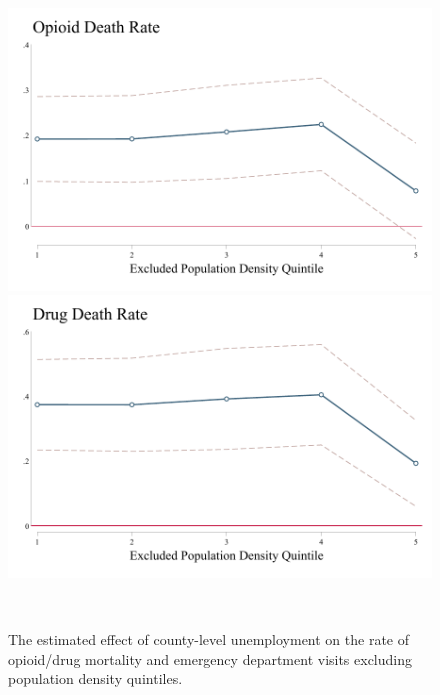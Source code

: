 \documentclass[12pt]{article}
\begin{document}
\FloatBarrier
			\newpage
		\FloatBarrier
		\begin{figure}[h]
			\caption[Excluding population density quintiles]{The estimated effect of county-level unemployment on the rate of opioid/drug mortality and emergency department visits excluding population density quintiles.}
			\begin{minipage}[c]{0.48\linewidth}
				\centering
				\includegraphics[width=\linewidth]{../results/appendix/figures/opioid_by_pop_den_quintile.pdf}
							  	\includegraphics[width=\linewidth]{../results/appendix/figures/drug_by_pop_den_quintile.pdf}
			\end{minipage}
			~
			\hspace{0.05cm}
			\begin{minipage}[c]{0.48\linewidth}\centering

\end{minipage}
\end{figure}
\end{document}
